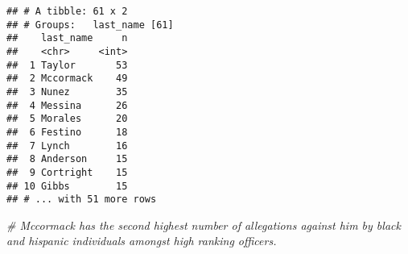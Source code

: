 \documentclass[
]{article}
\newenvironment{Shaded}{\begin{snugshade}}{\end{snugshade}}
\newcommand{\CommentTok}[1]{\textcolor[rgb]{0.56,0.35,0.01}{\textit{#1}}}
\begin{document}
\begin{verbatim}
## # A tibble: 61 x 2
## # Groups:   last_name [61]
##    last_name     n
##    <chr>     <int>
##  1 Taylor       53
##  2 Mccormack    49
##  3 Nunez        35
##  4 Messina      26
##  5 Morales      20
##  6 Festino      18
##  7 Lynch        16
##  8 Anderson     15
##  9 Cortright    15
## 10 Gibbs        15
## # ... with 51 more rows
\end{verbatim}

\begin{Shaded}
\begin{Highlighting}[]
\CommentTok{# Mccormack has the second highest number of allegations against him by black and hispanic individuals amongst high ranking officers.}
\end{Highlighting}
\end{Shaded}
\end{document}
